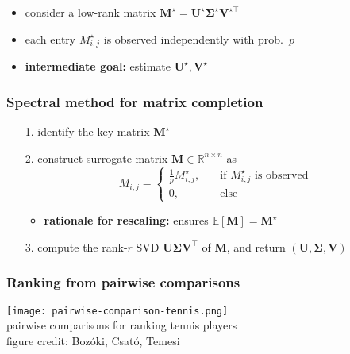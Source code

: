 \documentclass[compress,
mathserif,wide,%
]{beamer}
\begin{document}
\begin{frame}
\begin{columns}
\end{columns}



\begin{itemize}
	\itemsep0.5em
	\item consider a low-rank matrix $\bm{M}^{\star} = \bm{U}^{\star} \bm{\Sigma}^{\star} \bm{V}^{\star\top}$
	\item each entry $M_{i,j}^{\star}$   is observed independently with prob.~$p$
	\item {\bf intermediate goal:} estimate $\bm{U}^{\star}, \bm{V}^{\star}$
\end{itemize}


\end{frame}




\begin{frame}
\frametitle{Spectral method for matrix completion}

\begin{itemize}
	
	\item[{\color{black}1.}] identify the key matrix $\bm{M}^{\star}$
	\item[{\color{black}2.}] construct surrogate matrix ${\bm{M}}\in \mathbb{R}^{n\times n}$ as
	\[
		{M}_{i,j} = \begin{cases} \frac{1}{p} M_{i,j}^{\star}, \quad & \text{if }M_{i,j}^{\star}\text{ is observed} \\ 
					0,  & \text{else}	\end{cases} 
	\]
	\begin{itemize}
		\item {\bf rationale for rescaling:} ensures $\mathbb{E}[{\bm{M}}] = \bm{M}^{\star}$
	\end{itemize}

	\bigskip

\item[{\color{black}3.}] compute the rank-$r$ SVD ${\bm{U}}{\bm{\Sigma}}{\bm{V}}^{\top}$ of ${\bm{M}}$, and return $({\bm{U}}, {\bm{\Sigma}}, {\bm{V}})$

	
\end{itemize}


\end{frame}




\begin{frame}
	\frametitle{Ranking from pairwise comparisons}


	\begin{center}
		\texttt{[image: pairwise-comparison-tennis.png]} \\
		 pairwise comparisons for ranking tennis players  \\
		\hfill {\footnotesize figure credit: Boz\'{o}ki, Csat\'{o}, Temesi}
	\end{center}

\end{frame}
\end{document}
